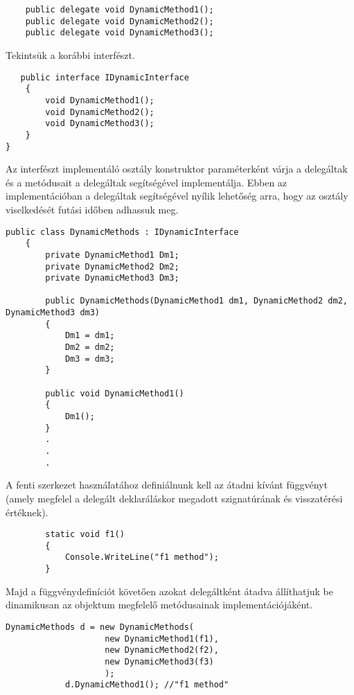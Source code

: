 \begin{lstlisting}
    public delegate void DynamicMethod1();
    public delegate void DynamicMethod2();
    public delegate void DynamicMethod3();
\end{lstlisting}

Tekintsük a korábbi interfészt.

\begin{lstlisting}
   public interface IDynamicInterface
    {
        void DynamicMethod1();
        void DynamicMethod2();
        void DynamicMethod3();
    }
}
\end{lstlisting}

Az interfészt implementáló osztály konstruktor paraméterként várja a delegáltak 
és a metódusait a delegáltak segítségével implementálja. Ebben az implementációban
a delegáltak segítségével nyílik lehetőség arra, hogy az osztály viselkedését futási
időben adhassuk meg.

\begin{lstlisting}
public class DynamicMethods : IDynamicInterface
    {
        private DynamicMethod1 Dm1;
        private DynamicMethod2 Dm2;
        private DynamicMethod3 Dm3;

        public DynamicMethods(DynamicMethod1 dm1, DynamicMethod2 dm2, DynamicMethod3 dm3)
        {
            Dm1 = dm1;
            Dm2 = dm2;
            Dm3 = dm3;
        }

        public void DynamicMethod1()
        {
            Dm1();
        }
		.
		.
		.
\end{lstlisting}		

A fenti szerkezet használatához definiálnunk kell az átadni kívánt függvényt (amely megfelel a delegált
deklaráláskor megadott szignatúrának és visszatérési értéknek).

\begin{lstlisting}
        static void f1()
        {
            Console.WriteLine("f1 method");
        }
\end{lstlisting}

Majd a függvénydefiníciót követően azokat delegáltként átadva állíthatjuk be dinamikusan az objektum megfelelő
metódusainak implementációjáként.	

\begin{lstlisting}
DynamicMethods d = new DynamicMethods(
                    new DynamicMethod1(f1),
                    new DynamicMethod2(f2),
                    new DynamicMethod3(f3)
                    );
            d.DynamicMethod1(); //"f1 method"
\end{lstlisting}

